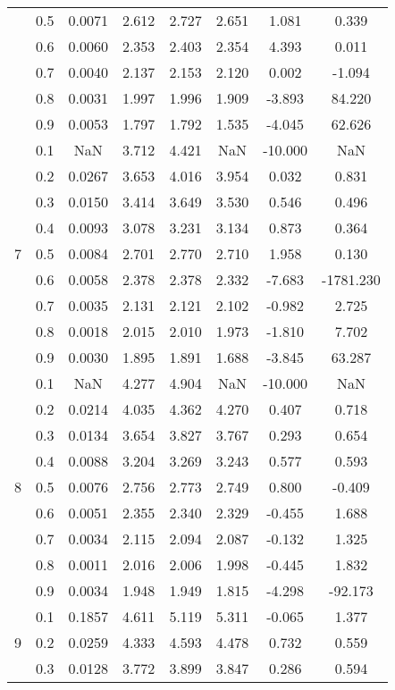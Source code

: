 \documentclass[11pt,a4paper]{report}
\begin{document}
\begin{longtable}{ | c | c || c | c | c | c | c | c | }
 & 0.5 & 0.0071 & 2.612 & 2.727 & 2.651 & 1.081 & 0.339 \\
 & 0.6 & 0.0060 & 2.353 & 2.403 & 2.354 & 4.393 & 0.011 \\
 & 0.7 & 0.0040 & 2.137 & 2.153 & 2.120 & 0.002 & -1.094 \\
 & 0.8 & 0.0031 & 1.997 & 1.996 & 1.909 & -3.893 & 84.220 \\
 & 0.9 & 0.0053 & 1.797 & 1.792 & 1.535 & -4.045 & 62.626 \\
 \hline
\multirow{9}{*}{7} & 0.1 & NaN & 3.712 & 4.421 & NaN & -10.000 & NaN \\
 & 0.2 & 0.0267 & 3.653 & 4.016 & 3.954 & 0.032 & 0.831 \\
 & 0.3 & 0.0150 & 3.414 & 3.649 & 3.530 & 0.546 & 0.496 \\
 & 0.4 & 0.0093 & 3.078 & 3.231 & 3.134 & 0.873 & 0.364 \\
 & 0.5 & 0.0084 & 2.701 & 2.770 & 2.710 & 1.958 & 0.130 \\
 & 0.6 & 0.0058 & 2.378 & 2.378 & 2.332 & -7.683 & -1781.230 \\
 & 0.7 & 0.0035 & 2.131 & 2.121 & 2.102 & -0.982 & 2.725 \\
 & 0.8 & 0.0018 & 2.015 & 2.010 & 1.973 & -1.810 & 7.702 \\
 & 0.9 & 0.0030 & 1.895 & 1.891 & 1.688 & -3.845 & 63.287 \\
 \hline
\multirow{9}{*}{8} & 0.1 & NaN & 4.277 & 4.904 & NaN & -10.000 & NaN \\
 & 0.2 & 0.0214 & 4.035 & 4.362 & 4.270 & 0.407 & 0.718 \\
 & 0.3 & 0.0134 & 3.654 & 3.827 & 3.767 & 0.293 & 0.654 \\
 & 0.4 & 0.0088 & 3.204 & 3.269 & 3.243 & 0.577 & 0.593 \\
 & 0.5 & 0.0076 & 2.756 & 2.773 & 2.749 & 0.800 & -0.409 \\
 & 0.6 & 0.0051 & 2.355 & 2.340 & 2.329 & -0.455 & 1.688 \\
 & 0.7 & 0.0034 & 2.115 & 2.094 & 2.087 & -0.132 & 1.325 \\
 & 0.8 & 0.0011 & 2.016 & 2.006 & 1.998 & -0.445 & 1.832 \\
 & 0.9 & 0.0034 & 1.948 & 1.949 & 1.815 & -4.298 & -92.173 \\
 \hline
\multirow{9}{*}{9} & 0.1 & 0.1857 & 4.611 & 5.119 & 5.311 & -0.065 & 1.377 \\
 & 0.2 & 0.0259 & 4.333 & 4.593 & 4.478 & 0.732 & 0.559 \\
 & 0.3 & 0.0128 & 3.772 & 3.899 & 3.847 & 0.286 & 0.594 \\

\end{longtable}
\end{document}
